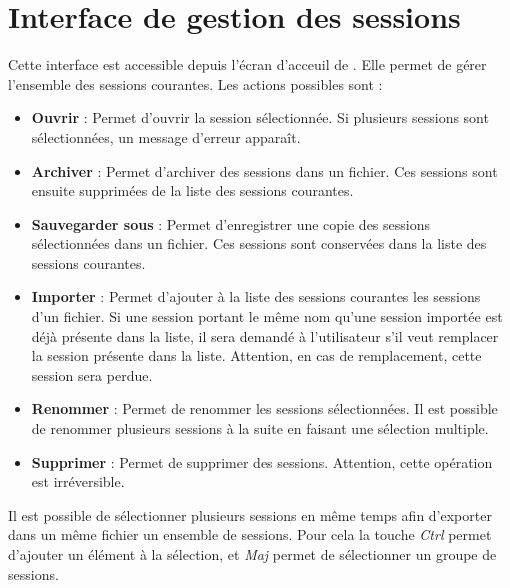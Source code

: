 \section{Interface de gestion des sessions}
Cette interface est accessible depuis l'écran d'acceuil de \tria. Elle permet de gérer l'ensemble des sessions courantes. Les actions possibles sont :\\
\begin{itemize}
\item \textbf{Ouvrir} : Permet d'ouvrir la session sélectionnée. Si plusieurs sessions sont sélectionnées, un message d'erreur apparaît.\\
\item \textbf{Archiver} : Permet d'archiver des sessions dans un fichier. Ces sessions sont ensuite supprimées de la liste des sessions courantes.\\
\item \textbf{Sauvegarder sous} : Permet d'enregistrer une copie des sessions sélectionnées dans un fichier. Ces sessions sont conservées dans la liste des sessions courantes.\\
\item \textbf{Importer} : Permet d'ajouter à la liste des sessions courantes les sessions d'un fichier. Si une session portant le même nom qu'une session importée est déjà présente dans la liste, il sera demandé à l'utilisateur s'il veut remplacer la session présente dans la liste. Attention, en cas de remplacement, cette session sera perdue.\\
\item \textbf{Renommer} : Permet de renommer les sessions sélectionnées. Il est possible de renommer plusieurs sessions à la suite en faisant une sélection multiple.\\
\item \textbf{Supprimer} : Permet de supprimer des sessions. Attention, cette opération est irréversible.\\
\end{itemize}

Il est possible de sélectionner plusieurs sessions en même temps afin d'exporter dans un même fichier un ensemble de sessions. Pour cela la touche \textit{Ctrl} permet d'ajouter un élément à la sélection, et \textit{Maj} permet de sélectionner un groupe de sessions.\\

